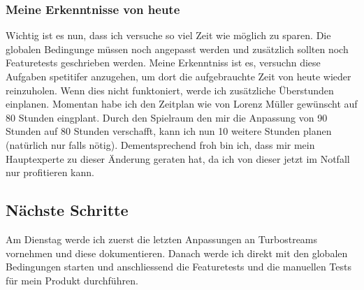 \subsubsection*{Meine Erkenntnisse von heute}
Wichtig ist es nun, dass ich versuche so viel Zeit wie möglich zu sparen. Die globalen Bedingunge müssen noch angepasst werden und
zusätzlich sollten noch Featuretests geschrieben werden. Meine Erkenntniss ist es, versuchn diese Aufgaben spetitifer anzugehen, um dort die 
aufgebrauchte Zeit von heute wieder reinzuholen. Wenn dies nicht funktoniert, werde ich zusätzliche Überstunden einplanen. Momentan habe ich den Zeitplan
wie von Lorenz Müller gewünscht auf 80 Stunden eingplant. Durch den Spielraum den mir die Anpassung von 90 Stunden auf 80 Stunden verschafft, kann ich
nun 10 weitere Stunden planen (natürlich nur falls nötig). Dementsprechend froh bin ich, dass mir mein Hauptexperte zu dieser Änderung geraten hat, 
da ich von dieser jetzt im Notfall nur profitieren kann.

\subsection*{Nächste Schritte}
Am Dienstag werde ich zuerst die letzten Anpassungen an Turbostreams vornehmen und diese dokumentieren. Danach
werde ich direkt mit den globalen Bedingungen starten und anschliessend die Featuretests und die manuellen Tests für mein
Produkt durchführen.

\pagebreak
